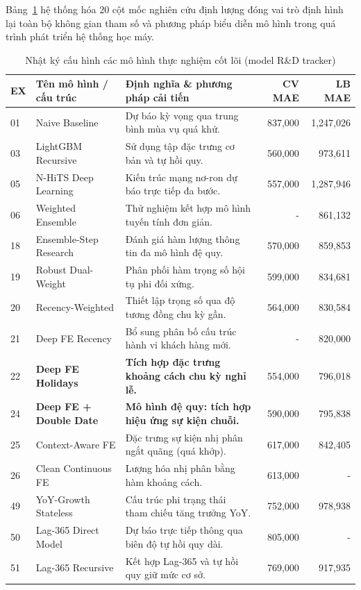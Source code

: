 \documentclass{article}
\begin{document}
Bảng~\ref{tab:experiments} hệ thống hóa 20 cột mốc nghiên cứu định lượng đóng vai trò định hình lại toàn bộ không gian tham số và phương pháp biểu diễn mô hình trong quá trình phát triển hệ thống học máy.

\begin{table}[H]
\caption{Nhật ký cấu hình các mô hình thực nghiệm cốt lõi (model R\&D tracker)}
\label{tab:experiments}
\centering
\small
\begin{tabular}{@{}llp{7cm}rr@{}}
\toprule
EX & Tên mô hình / cấu trúc & Định nghĩa \& phương pháp cải tiến & CV MAE & LB MAE \\
\midrule
01 & Naive Baseline & Dự báo kỳ vọng qua trung bình mùa vụ quá khứ. & 837,000 & 1,247,026 \\
03 & LightGBM Recursive & Sử dụng tập đặc trưng cơ bản và tự hồi quy. & 560,000 & 973,611 \\
05 & N-HiTS Deep Learning & Kiến trúc mạng nơ-ron dự báo trực tiếp đa bước. & 557,000 & 1,287,946 \\
06 & Weighted Ensemble & Thử nghiệm kết hợp mô hình tuyến tính đơn giản. & - & 861,132 \\
18 & Ensemble-Step Research & Đánh giá hàm lượng thông tin đa mô hình đệ quy. & 570,000 & 859,853 \\
19 & Robust Dual-Weight & Phân phối hàm trọng số hội tụ phi đối xứng. & 599,000 & 834,681 \\
20 & Recency-Weighted & Thiết lập trọng số qua độ tương đồng chu kỳ gần. & 564,000 & 830,584 \\
21 & Deep FE Recency & Bổ sung phân bố cấu trúc hành vi khách hàng mới. & - & 820,000 \\
22 & \textbf{Deep FE Holidays} & \textbf{Tích hợp đặc trưng khoảng cách chu kỳ nghỉ lễ.} & 554,000 & 796,018 \\
24 & \textbf{Deep FE + Double Date} & \textbf{Mô hình đệ quy: tích hợp hiệu ứng sự kiện chuỗi.} & 590,000 & 795,838 \\
25 & Context-Aware FE & Đặc trưng sự kiện nhị phân ngắt quãng (quá khớp). & 617,000 & 842,405 \\
26 & Clean Continuous FE & Lượng hóa nhị phân bằng hàm khoảng cách. & 613,000 & - \\
49 & YoY-Growth Stateless & Cấu trúc phi trạng thái tham chiếu tăng trưởng YoY. & 752,000 & 978,938 \\
50 & Lag-365 Direct Model & Dự báo trực tiếp thông qua biên độ tự hồi quy dài. & 805,000 & - \\
51 & Lag-365 Recursive & Kết hợp Lag-365 và tự hồi quy giữ mức cơ sở. & 769,000 & 917,935 \\

\end{tabular}
\end{table}
\end{document}
